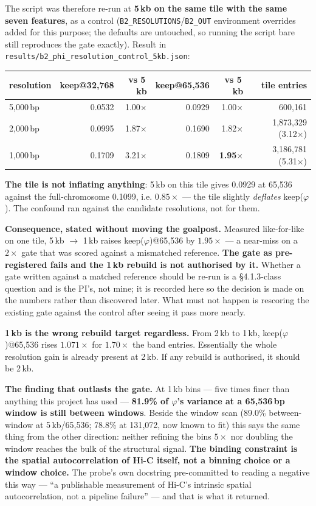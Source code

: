 \documentclass[11pt,a4paper]{article}
\newcommand{\code}[1]{\texttt{\small #1}}
\begin{document}
The script was therefore re-run at \textbf{5\,kb on the same tile with the
same seven features}, as a control (\code{B2\_RESOLUTIONS}/\code{B2\_OUT}
environment overrides added for this purpose; the defaults are untouched, so
running the script bare still reproduces the gate exactly). Result in
\code{results/b2\_phi\_resolution\_control\_5kb.json}:

\begin{center}
\begin{tabular}{lrrrrr}
\hline
resolution & keep@32{,}768 & vs 5\,kb & keep@65{,}536 & vs 5\,kb & tile entries \\
\hline
5{,}000\,bp & 0.0532 & 1.00$\times$ & 0.0929 & 1.00$\times$ & 600{,}161 \\
2{,}000\,bp & 0.0995 & 1.87$\times$ & 0.1690 & 1.82$\times$ & 1{,}873{,}329 (3.12$\times$) \\
1{,}000\,bp & 0.1709 & 3.21$\times$ & 0.1809 & \textbf{1.95}$\times$ & 3{,}186{,}781 (5.31$\times$) \\
\hline
\end{tabular}
\end{center}

\textbf{The tile is not inflating anything}: 5\,kb on this tile gives 0.0929
at 65{,}536 against the full-chromosome 0.1099, i.e. $0.85\times$ --- the tile
slightly \emph{deflates} keep($\varphi$). The confound ran against the
candidate resolutions, not for them.

\textbf{Consequence, stated without moving the goalpost.} Measured
like-for-like on one tile, 5\,kb $\to$ 1\,kb raises keep($\varphi$)@65{,}536
by $1.95\times$ --- a near-miss on a $2\times$ gate that was scored against a
mismatched reference. \textbf{The gate as pre-registered fails and the 1\,kb
rebuild is not authorised by it.} Whether a gate written against a matched
reference should be re-run is a \S4.1.3-class question and is the PI's, not
mine; it is recorded here so the decision is made on the numbers rather than
discovered later. What must not happen is rescoring the existing gate against
the control after seeing it pass more nearly.

\textbf{1\,kb is the wrong rebuild target regardless.} From 2\,kb to 1\,kb,
keep($\varphi$)@65{,}536 rises $1.071\times$ for $1.70\times$ the band
entries. Essentially the whole resolution gain is already present at 2\,kb.
If any rebuild is authorised, it should be 2\,kb.

\textbf{The finding that outlasts the gate.} At 1\,kb bins --- five times
finer than anything this project has used --- \textbf{81.9\% of $\varphi$'s
variance at a 65{,}536\,bp window is still between windows}. Beside the window
scan (89.0\% between-window at 5\,kb/65{,}536; 78.8\% at 131{,}072, now known
to fit) this says the same thing from the other direction: neither refining
the bins $5\times$ nor doubling the window reaches the bulk of the structural
signal. \textbf{The binding constraint is the spatial autocorrelation of Hi-C
itself, not a binning choice or a window choice.} The probe's own docstring
pre-committed to reading a negative this way --- ``a publishable measurement
of Hi-C's intrinsic spatial autocorrelation, not a pipeline failure'' --- and
that is what it returned.
\end{document}
